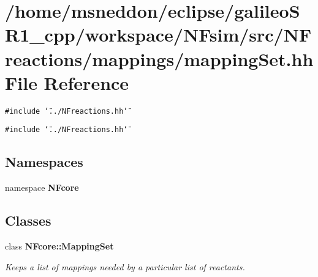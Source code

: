 \section{/home/msneddon/eclipse/galileoSR1\_\-cpp/workspace/NFsim/src/NFreactions/mappings/mappingSet.hh File Reference}
\label{mappingSet_8hh}


{\tt \#include \char`\"{}../NFreactions.hh\char`\"{}}\par
{\tt \#include \char`\"{}../NFreactions.hh\char`\"{}}\par
\subsection*{Namespaces}
\begin{CompactItemize}
\item 
namespace {\bf NFcore}
\end{CompactItemize}
\subsection*{Classes}
\begin{CompactItemize}
\item 
class {\bf NFcore::MappingSet}
\begin{CompactList}\small\item\em Keeps a list of mappings needed by a particular list of reactants. \item\end{CompactList}\end{CompactItemize}
